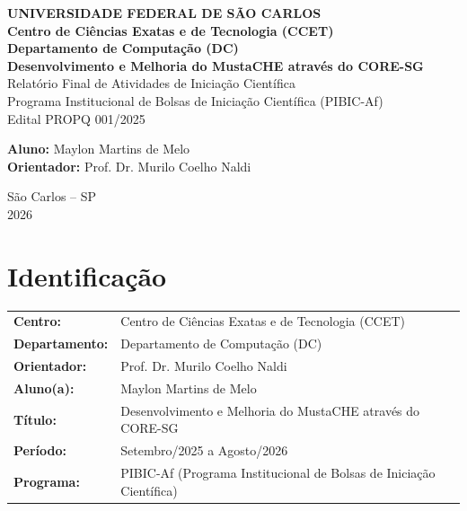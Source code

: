 \documentclass[12pt,a4paper,oneside]{article}
\begin{document}
\begin{titlepage}
  \centering
  \vspace*{2cm}
  {\large \textbf{UNIVERSIDADE FEDERAL DE SÃO CARLOS}}\\[0.3cm]
  {\large \textbf{Centro de Ciências Exatas e de Tecnologia (CCET)}}\\[0.3cm]
  {\large \textbf{Departamento de Computação (DC)}}\\[3cm]

  {\Large \textbf{Desenvolvimento e Melhoria do MustaCHE através do CORE-SG}}\\[2cm]

  {\large Relatório Final de Atividades de Iniciação Científica}\\[0.5cm]
  {\large Programa Institucional de Bolsas de Iniciação Científica (PIBIC-Af)}\\[0.5cm]
  {\large Edital PROPQ 001/2025}\\[3cm]

  \begin{flushright}
    \textbf{Aluno:} Maylon Martins de Melo\\
    \textbf{Orientador:} Prof. Dr. Murilo Coelho Naldi\\
  \end{flushright}

  \vfill
  {\large São Carlos -- SP}\\
  {\large 2026}
\end{titlepage}

\section{Identificação}

\begin{center}
  \begin{tabularx}{\textwidth}{>{\bfseries}l X}
    \toprule
    Centro:        & Centro de Ciências Exatas e de Tecnologia (CCET) \\
    Departamento:  & Departamento de Computação (DC) \\
    Orientador:    & Prof. Dr. Murilo Coelho Naldi \\
    Aluno(a):      & Maylon Martins de Melo \\
    Título:        & Desenvolvimento e Melhoria do MustaCHE através do CORE-SG \\
    Período:       & Setembro/2025 a Agosto/2026 \\
    Programa:      & PIBIC-Af (Programa Institucional de Bolsas de Iniciação Científica) \\
    \bottomrule
  \end{tabularx}
\end{center}
\end{document}
